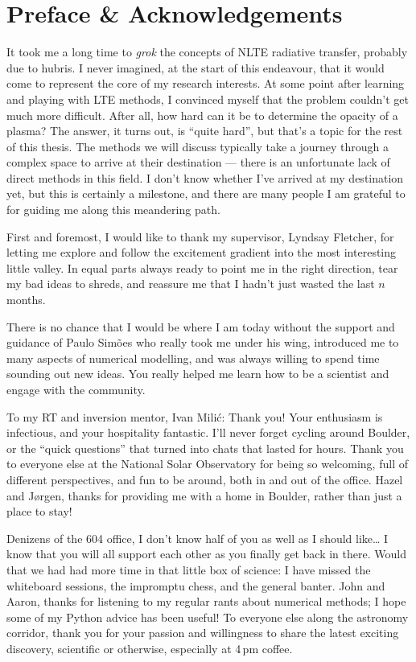 \chapter{Preface \& Acknowledgements}

It took me a long time to \emph{grok} the concepts of NLTE radiative transfer, probably due to hubris.
I never imagined, at the start of this endeavour, that it would come to represent the core of my research interests.
At some point after learning and playing with LTE methods, I convinced myself that the problem couldn't get much more difficult.
After all, how hard can it be to determine the opacity of a plasma?
The answer, it turns out, is ``quite hard'', but that's a topic for the rest of this thesis.
The methods we will discuss typically take a journey through a complex space to arrive at their destination --- there is an unfortunate lack of direct methods in this field.
I don't know whether I've arrived at my destination yet, but this is certainly a milestone, and there are many people I am grateful to for guiding me along this meandering path.

First and foremost, I would like to thank my supervisor, Lyndsay Fletcher, for letting me explore and follow the excitement gradient into the most interesting little valley.
In equal parts always ready to point me in the right direction, tear my bad ideas to shreds, and reassure me that I hadn't just wasted the last $n$ months.

There is no chance that I would be where I am today without the support and guidance of Paulo Sim\~{o}es who really took me under his wing, introduced me to many aspects of numerical modelling, and was always willing to spend time sounding out new ideas.
You really helped me learn how to be a scientist and engage with the community.

To my RT and inversion mentor, Ivan Mili\'{c}: Thank you!
Your enthusiasm is infectious, and your hospitality fantastic.
I'll never forget cycling around Boulder, or the ``quick questions'' that turned into chats that lasted for hours.
Thank you to everyone else at the National Solar Observatory for being so welcoming, full of different perspectives, and fun to be around, both in and out of the office.
Hazel and J{\o}rgen, thanks for providing me with a home in Boulder, rather than just a place to stay!

Denizens of the 604 office, I don't know half of you as well as I should like\dots{}
I know that you will all support each other as you finally get back in there.
Would that we had had more time in that little box of science: I have missed the whiteboard sessions, the impromptu chess, and the general banter.
John and Aaron, thanks for listening to my regular rants about numerical methods; I hope some of my Python advice has been useful!
To everyone else along the astronomy corridor, thank you for your passion and willingness to share the latest exciting discovery, scientific or otherwise, especially at 4\,pm coffee.

